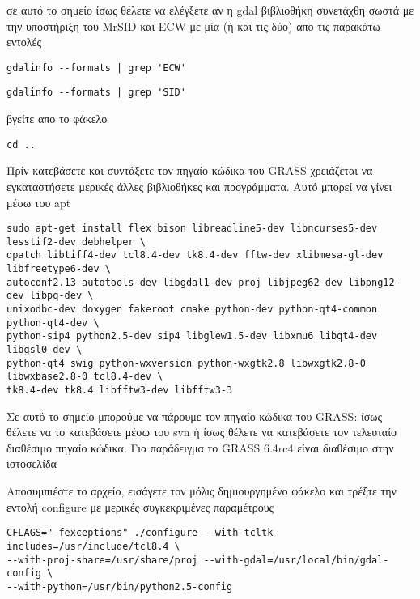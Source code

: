 σε αυτό το σημείο ίσως θέλετε να ελέγξετε αν η gdal βιβλιοθήκη συνετάχθη σωστά με την υποστήριξη του MrSID και ECW με μία (ή και τις δύο) απο τις παρακάτω εντολές

\begin{verbatim}
gdalinfo --formats | grep 'ECW'
\end{verbatim}

\begin{verbatim}
gdalinfo --formats | grep 'SID'
\end{verbatim}

βγείτε απο το φάκελο

\begin{verbatim}
cd ..
\end{verbatim}

Πρίν κατεβάσετε και συντάξετε τον πηγαίο κώδικα του GRASS χρειάζεται να εγκαταστήσετε μερικές άλλες βιβλιοθήκες και προγράμματα. Αυτό μπορεί να γίνει μέσω του apt

\begin{verbatim}
sudo apt-get install flex bison libreadline5-dev libncurses5-dev lesstif2-dev debhelper \
dpatch libtiff4-dev tcl8.4-dev tk8.4-dev fftw-dev xlibmesa-gl-dev libfreetype6-dev \
autoconf2.13 autotools-dev libgdal1-dev proj libjpeg62-dev libpng12-dev libpq-dev \
unixodbc-dev doxygen fakeroot cmake python-dev python-qt4-common python-qt4-dev \
python-sip4 python2.5-dev sip4 libglew1.5-dev libxmu6 libqt4-dev libgsl0-dev \
python-qt4 swig python-wxversion python-wxgtk2.8 libwxgtk2.8-0 libwxbase2.8-0 tcl8.4-dev \
tk8.4-dev tk8.4 libfftw3-dev libfftw3-3
\end{verbatim}

Σε αυτό το σημείο μπορούμε να πάρουμε τον πηγαίο κώδικα του GRASS: ίσως θέλετε να το κατεβάσετε μέσω του svn ή ίσως θέλετε να κατεβάσετε τον τελευταίο διαθέσιμο πηγαίο κώδικα.
 Για παράδειγμα το GRASS 6.4rc4 είναι διαθέσιμο στην ιστοσελίδα 

Αποσυμπιέστε το αρχείο, εισάγετε τον μόλις δημιουργημένο φάκελο και τρέξτε την εντολή configure με μερικές συγκεκριμένες παραμέτρους

\begin{verbatim}
CFLAGS="-fexceptions" ./configure --with-tcltk-includes=/usr/include/tcl8.4 \
--with-proj-share=/usr/share/proj --with-gdal=/usr/local/bin/gdal-config \
--with-python=/usr/bin/python2.5-config
\end{verbatim}


